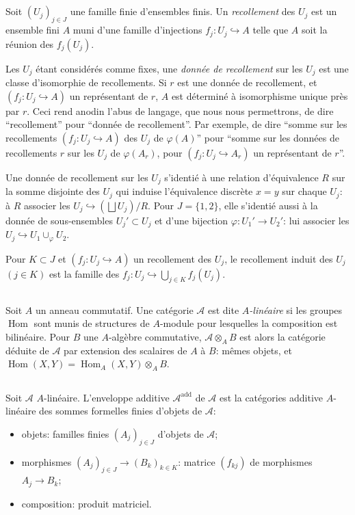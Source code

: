 \documentclass[11pt,a4paper]{article}
\theoremstyle{plain}
\theoremstyle{definition}
\DeclareMathOperator{\Hom}{Hom}
\newcommand{\inj}{\hookrightarrow}
\begin{document}
\subsection{}
Soit $(U_j)_{j \in J}$ une famille finie d'ensembles finis. Un \emph{recollement} des $U_j$ est un ensemble fini $A$ muni d'une famille d'injections $f_j : U_j \inj A$ telle que $A$ soit la r\'eunion des $f_j(U_j)$.

Les $U_j$ \'etant consid\'er\'es comme fixes, une \emph{donn\'ee de recollement} sur les $U_j$ est une classe d'isomorphie de recollements. Si $r$ est une donn\'ee de recollement, et $(f_j : U_j \inj A)$ un repr\'esentant de $r$, $A$ est d\'etermin\'e \`a isomorphisme unique pr\`es par $r$. Ceci rend anodin l'abus de langage, que nous nous permettrons, de dire ``recollement'' pour ``donn\'ee de recollement''. Par exemple, de dire ``somme sur les recollements $(f_j : U_j \inj A)$ des $U_j$ de $\varphi(A)$'' pour ``somme sur les donn\'ees de recollements $r$ sur les $U_j$ de $\varphi(A_r)$, pour $(f_j : U_j \inj A_r)$ un repr\'esentant de $r$''.

Une donn\'ee de recollement sur les $U_j$ s'identi\'e \`a une relation d'\'equivalence $R$ sur la somme disjointe des $U_j$ qui induise l'\'equivalence discr\`ete $x = y$ sur chaque $U_j$: \`a $R$ associer les $U_j \inj (\bigsqcup U_j)/R$. Pour $J = \{1, 2\}$, elle s'identi\'e aussi \`a la donn\'ee de sous-ensembles $U_j' \subset U_j$ et d'une bijection $\varphi : U_1' \to U_2'$: lui associer les $U_j \inj U_1 \cup_\varphi U_2$.

Pour $K \subset J$ et $(f_j : U_j \inj A)$ un recollement des $U_j$, le recollement induit des $U_j$ $(j \in K)$ est la famille des $f_j : U_j \inj \bigcup_{j \in K} f_j(U_j)$.

\subsection{}
Soit $A$ un anneau commutatif. Une cat\'egorie $\mathcal{A}$ est dite $A$\emph{-lin\'eaire} si les groupes $\Hom$ sont munis de structures de $A$-module pour lesquelles la composition est bilin\'eaire. Pour $B$ une $A$-alg\`ebre commutative, $\mathcal{A} \otimes_A B$ est alors la cat\'egorie d\'eduite de $\mathcal{A}$ par extension des scalaires de $A$ \`a $B$: m\^emes objets, et $\Hom(X,Y) = \Hom_A(X,Y) \otimes_A B$.

\subsection{}
Soit $\mathcal{A}$ $A$-lin\'eaire. L'enveloppe additive $\mathcal{A}^{\text{add}}$ de $\mathcal{A}$ est la cat\'egories additive $A$-lin\'eaire des sommes formelles finies d'objets de $\mathcal{A}$:
\begin{itemize}[label={},leftmargin=*]
\item objets: familles finies $(A_j)_{j \in J}$ d'objets de $\mathcal{A}$;
\item morphismes $(A_j)_{j \in J} \to (B_k)_{k \in K}$: matrice $(f_{kj})$ de morphismes $A_j \to B_k$;
\item composition: produit matriciel.
\end{itemize}
\end{document}

